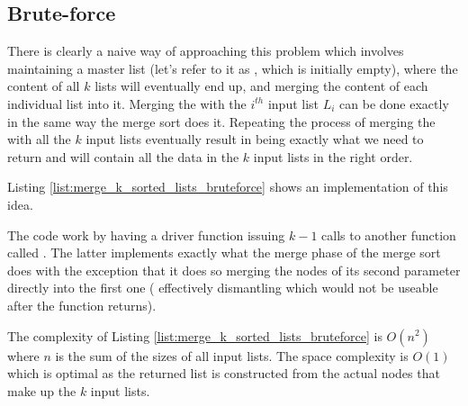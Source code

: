 \subsection{Brute-force}
\label{merge_k_sorted_lists:sec:bruteforce}
There is clearly a naive way of approaching this problem which involves maintaining a master list (let's refer to it as , which is initially empty), where the content of all $k$ lists will eventually end up, and merging the content of each individual list into it. 
Merging the  with the $i^{th}$ input list $L_i$ can be done exactly in the same way the merge sort does it. 
Repeating the process of merging the  with all the $k$ input lists eventually result in  being exactly what we need to return and will contain all the data in the $k$ input lists in the right order.

Listing \ref{list:merge_k_sorted_lists_bruteforce} shows an implementation of this idea.



The code work by having a driver function  issuing $k-1$ calls to another function called . The latter implements exactly what the merge phase of the merge sort does with the exception that it does so merging the nodes of its second parameter  directly into the first one  ( effectively dismantling  which would not be useable after the function returns).

The complexity of Listing \ref{list:merge_k_sorted_lists_bruteforce} is $O(n^2)$ where $n$ is the sum of the sizes of all input lists. The space complexity is $O(1)$ which is optimal as the returned list is constructed from the actual nodes that make up the $k$ input lists.


